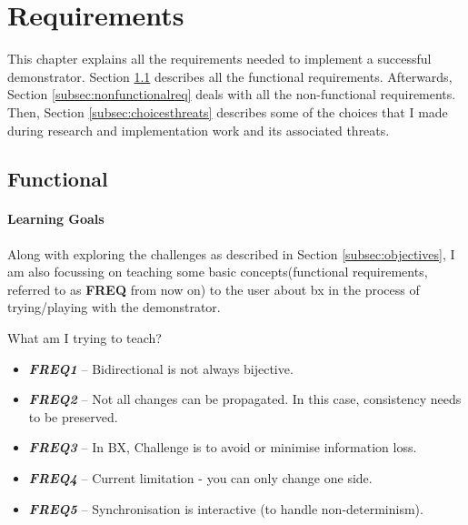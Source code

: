 \section{Requirements}\label{sec:requirements}
This chapter explains all the requirements needed to implement a successful demonstrator. Section \ref{subsec:functionalreq} describes all the functional requirements. Afterwards, Section \ref{subsec:nonfunctionalreq} deals with all the non-functional requirements. Then, Section \ref{subsec:choicesthreats} describes some of the choices that I made during research and  implementation work and its associated threats. 

\subsection{Functional}\label{subsec:functionalreq}
\paragraph{Learning Goals}
Along with exploring the challenges as described in Section \ref{subsec:objectives}, I am also focussing on teaching some basic concepts(functional requirements, referred to as \textbf{FREQ} from now on) to the user about bx in the process of trying/playing with the demonstrator.

What am I trying to teach?
\begin{itemize} 
	\item {\textbf{\textit{FREQ1}} -- Bidirectional is not always bijective.} 
	\item {\textbf{\textit{FREQ2}} -- Not all changes can be propagated. In this case, consistency needs to be preserved.}
	\item {\textbf{\textit{FREQ3}} -- In BX, Challenge is to avoid or minimise information loss.}
	\item {\textbf{\textit{FREQ4}} -- Current limitation - you can only change one side.}
	\item {\textbf{\textit{FREQ5}} -- Synchronisation is interactive (to handle non-determinism).}	
\end{itemize}
